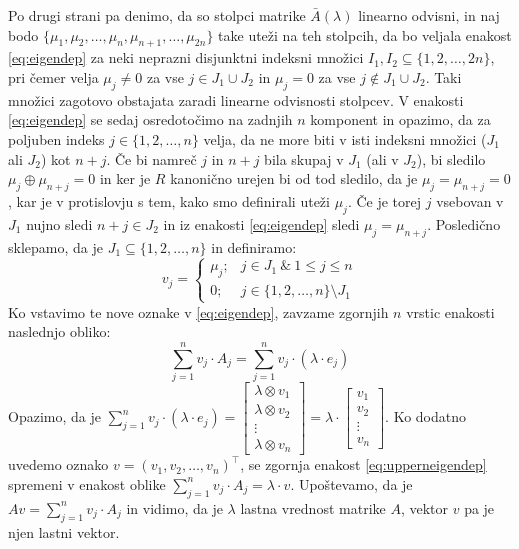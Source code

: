 \documentclass[mat1]{fmfdelo}
\begin{document}
\begin{dokaz}
	Po drugi strani pa denimo, da so stolpci matrike $\bar{A}(\lambda)$ linearno odvisni, in naj bodo $\{\mu_1, \mu_2, \ldots, \mu_n, \mu_{n+1}, \ldots, \mu_{2n}\}$ take uteži na teh stolpcih, da bo veljala enakost \eqref{eq:eigendep} za neki neprazni disjunktni indeksni množici $I_1, I_2 \subseteq \{1, 2, \ldots, 2n\}$, pri čemer velja $\mu_j \neq 0$ za vse $j\in J_1\cup J_2$ in $\mu_j = 0$ za vse $j \notin J_1\cup J_2$. Taki množici zagotovo obstajata zaradi linearne odvisnosti stolpcev. V enakosti \eqref{eq:eigendep} se sedaj osredotočimo na zadnjih $n$ komponent in opazimo, da za poljuben indeks $j \in \{1, 2, \ldots, n\}$ velja, da ne more biti v isti indeksni množici ($J_1$ ali $J_2$) kot $n+j$. Če bi namreč $j$ in $n+j$ bila skupaj v $J_1$ (ali v $J_2$), bi sledilo $\mu_j \oplus \mu_{n+j} = 0$ in ker je $R$ kanonično urejen bi od tod sledilo, da je $\mu_j = \mu_{n+j} = 0$, kar je v protislovju s tem, kako smo definirali uteži $\mu_j$. Če je torej $j$ vsebovan v $J_1$ nujno sledi $n+j \in J_2$ in iz enakosti \eqref{eq:eigendep} sledi $\mu_j = \mu_{n+j}$. Posledično sklepamo, da je $J_1 \subseteq \{1, 2, \ldots, n\}$ in definiramo: $$v_j = \begin{cases}
		\mu_j;& j\in J_1~\&~1\leq j \leq n \\ 
		0;& j\in \{1, 2, \ldots, n\}\setminus J_1
	\end{cases}$$
Ko vstavimo te nove oznake v \eqref{eq:eigendep}, zavzame zgornjih $n$ vrstic enakosti naslednjo obliko: \begin{equation}\label{eq:upperneigendep}
	\sum_{j = 1}^{n} v_j \cdot A_j = \sum_{j = 1}^{n} v_j \cdot (\lambda\cdot e_j)
\end{equation}
Opazimo, da je $ \sum_{j = 1}^{n} v_j \cdot (\lambda\cdot e_j) = \begin{bmatrix}
	\lambda \otimes v_1 \\
	\lambda \otimes v_2 \\
	\vdots \\
	\lambda \otimes v_n
\end{bmatrix} = \lambda \cdot \begin{bmatrix}
	v_1 \\
	v_2 \\
	\vdots \\
	v_n
\end{bmatrix}$.
Ko dodatno uvedemo oznako $v = (v_1, v_2, \ldots, v_n)^\top$, se zgornja enakost \eqref{eq:upperneigendep} spremeni v enakost oblike $\sum_{j = 1}^{n} v_j \cdot A_j = \lambda\cdot v$. Upoštevamo, da je $Av = \sum_{j = 1}^{n} v_j \cdot A_j$ in vidimo, da je $\lambda$ lastna vrednost matrike $A$, vektor $v$ pa je njen lastni vektor.
\end{dokaz}
	
\end{document}
